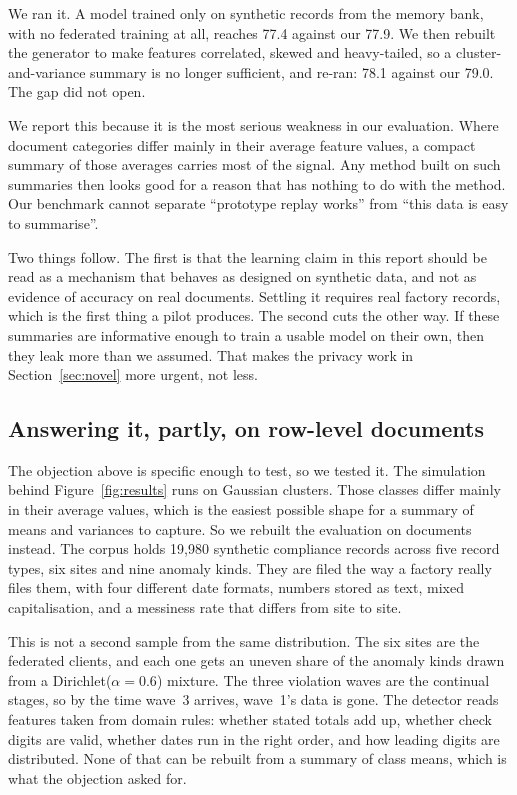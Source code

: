 \documentclass[11pt,a4paper]{article}
\begin{document}
We ran it. A model trained only on synthetic records from the memory bank, with
no federated training at all, reaches 77.4 against our 77.9. We then rebuilt the
generator to make features correlated, skewed and heavy-tailed, so a
cluster-and-variance summary is no longer sufficient, and re-ran: 78.1 against
our 79.0. The gap did not open.

We report this because it is the most serious weakness in our evaluation. Where
document categories differ mainly in their average feature values, a compact
summary of those averages carries most of the signal. Any method built on such
summaries then looks good for a reason that has nothing to do with the method.
Our benchmark cannot separate ``prototype replay works'' from ``this data is
easy to summarise''.

Two things follow. The first is that the learning claim in this report should be
read as a mechanism that behaves as designed on synthetic data, and not as
evidence of accuracy on real documents. Settling it requires real factory
records, which is the first thing a pilot produces. The second cuts the other
way. If these summaries are informative enough to train a usable model on their
own, then they leak more than we assumed. That makes the privacy work in
Section~\ref{sec:novel} more urgent, not less.

\subsection{Answering it, partly, on row-level documents}
\label{sec:corpus}

The objection above is specific enough to test, so we tested it. The simulation
behind Figure~\ref{fig:results} runs on Gaussian clusters. Those classes differ
mainly in their average values, which is the easiest possible shape for a summary
of means and variances to capture. So we rebuilt the evaluation on documents
instead. The corpus holds 19{,}980 synthetic compliance records across five record
types, six sites and nine anomaly kinds. They are filed the way a factory really
files them, with four different date formats, numbers stored as text, mixed
capitalisation, and a messiness rate that differs from site to site.

This is not a second sample from the same distribution. The six sites are the
federated clients, and each one gets an uneven share of the anomaly kinds drawn
from a Dirichlet($\alpha{=}0.6$) mixture. The three violation waves are the
continual stages, so by the time wave~3 arrives, wave~1's data is gone. The
detector reads features taken from domain rules: whether stated totals add up,
whether check digits are valid, whether dates run in the right order, and how
leading digits are distributed. None of that can be rebuilt from a summary of
class means, which is what the objection asked for.
\end{document}

